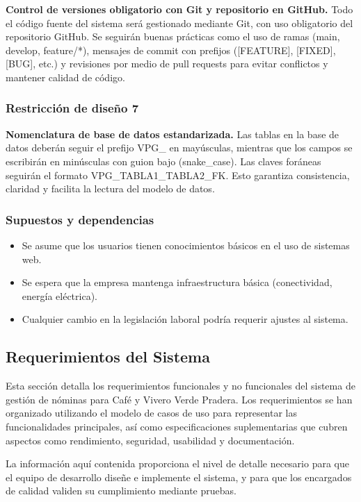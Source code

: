 \textbf{Control de versiones obligatorio con Git y repositorio en GitHub.}
Todo el código fuente del sistema será gestionado mediante Git, con uso obligatorio del repositorio GitHub. Se seguirán buenas prácticas como el uso de ramas (main, develop, feature/*), mensajes de commit con prefijos ([FEATURE], [FIXED], [BUG], etc.) y revisiones por medio de pull requests para evitar conflictos y mantener calidad de código.

\subsubsection*{Restricción de diseño 7}

\textbf{Nomenclatura de base de datos estandarizada.}
Las tablas en la base de datos deberán seguir el prefijo VPG\_ en mayúsculas, mientras que los campos se escribirán en minúsculas con guion bajo (snake\_case). Las claves foráneas seguirán el formato VPG\_TABLA1\_TABLA2\_FK. Esto garantiza consistencia, claridad y facilita la lectura del modelo de datos.

\subsubsection*{Supuestos y dependencias}

\begin{itemize}
	\item Se asume que los usuarios tienen conocimientos básicos en el uso de sistemas web.
	\item Se espera que la empresa mantenga infraestructura básica (conectividad, energía eléctrica).
	\item Cualquier cambio en la legislación laboral podría requerir ajustes al sistema.
\end{itemize}


\subsection*{Requerimientos del Sistema}

Esta sección detalla los requerimientos funcionales y no funcionales del sistema
de gestión de nóminas para Café y Vivero Verde Pradera. Los requerimientos se han
organizado utilizando el modelo de casos de uso para representar las funcionalidades
principales, así como especificaciones suplementarias que cubren aspectos como rendimiento,
seguridad, usabilidad y documentación.

La información aquí contenida proporciona el nivel de detalle necesario para que el
equipo de desarrollo diseñe e implemente el sistema, y para que los encargados de calidad
validen su cumplimiento mediante pruebas.

